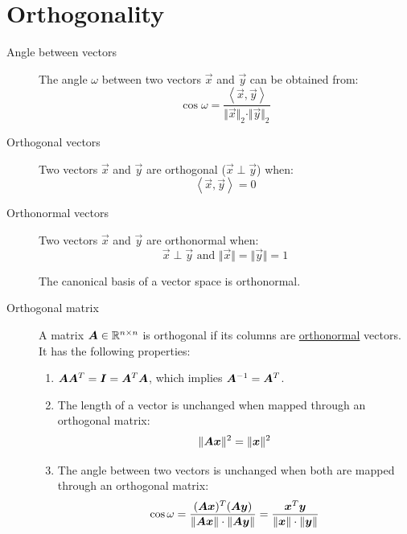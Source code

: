 \section{Orthogonality}
\begin{description}
    \item[Angle between vectors] 
        The angle $\omega$ between two vectors $\vec{x}$ and $\vec{y}$ can be obtained from:
        \begin{equation*}
            \cos\omega = \frac{\left\langle \vec{x}, \vec{y} \right\rangle }{\Vert \vec{x} \Vert_2 \cdot \Vert \vec{y} \Vert_2}
        \end{equation*}
    
    \item[Orthogonal vectors] 
        Two vectors $\vec{x}$ and $\vec{y}$ are orthogonal ($\vec{x} \perp \vec{y}$) when:
        \[ \left\langle \vec{x}, \vec{y} \right\rangle = 0 \]
    
    \item[Orthonormal vectors] 
        Two vectors $\vec{x}$ and $\vec{y}$ are orthonormal when:
        \[ \vec{x} \perp \vec{y} \text{ and } \Vert \vec{x} \Vert = \Vert \vec{y} \Vert=1 \]
        \begin{theorem}
            The canonical basis of a vector space is orthonormal.
        \end{theorem}
    
    \item[Orthogonal matrix] 
        A matrix ${\bm{A}} \in \mathbb{R}^{n \times n}$ is orthogonal if its columns are \underline{orthonormal} vectors.
        It has the following properties:
        \begin{enumerate}
            \item ${\bm{A}}{\bm{A}}^T = {\bm{I}} = {\bm{A}}^T{\bm{A}}$, which implies ${\bm{A}}^{-1} = {\bm{A}}^T$.
            \item The length of a vector is unchanged when mapped through an orthogonal matrix: 
                \[ \Vert {\bm{A}}{\bm{x}} \Vert^2 = \Vert {\bm{x}} \Vert^2 \]
            \item The angle between two vectors is unchanged when both are mapped through an orthogonal matrix:
                \[ 
                    \cos\omega = \frac{({\bm{A}}{\bm{x}})^T({\bm{A}}{\bm{y}})}{\Vert {\bm{A}}{\bm{x}} \Vert \cdot \Vert {\bm{A}}{\bm{y}} \Vert} = 
                        \frac{{\bm{x}}^T{\bm{y}}}{\Vert {\bm{x}} \Vert \cdot \Vert {\bm{y}} \Vert}
                \]
        \end{enumerate}


\end{description}
